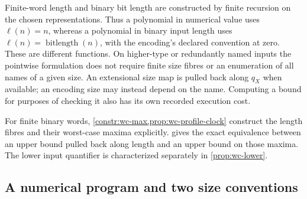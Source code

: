 \documentclass[11pt,a4paper]{article}
\numberwithin{algorithm}{section}
\numberwithin{equation}{section}
\theoremstyle{definition}
\theoremstyle{remark}
\theoremstyle{plain}
\theoremstyle{definition}
\theoremstyle{plain}
\begin{document}
Finite-word length and binary bit length are constructed by finite
recursion on the chosen representations. Thus a polynomial in numerical
value uses $\ell(n)=n$, whereas a polynomial in binary input length
uses $\ell(n)=\operatorname{bitlength}(n)$, with the encoding's declared
convention at zero. These are different functions. On higher-type or
redundantly named inputs the pointwise formulation does not require
finite size fibres or an enumeration of all names of a given size.
An extensional size map is pulled back along $q_X$ when available;
an encoding size may instead depend on the name. Computing a bound
for purposes of checking it also has its own recorded execution cost.

For finite binary words, \cref{constr:wc-max,prop:wc-profile-clock}
construct the length fibres and their worst-case maxima explicitly.
 gives the exact equivalence between an
upper bound pulled back along length and an upper bound on those
maxima. The lower input quantifier is characterized separately in
\cref{prop:wc-lower}.

\subsection{A numerical program and two size conventions}
\label{app:complexity-size-example}
\end{document}
